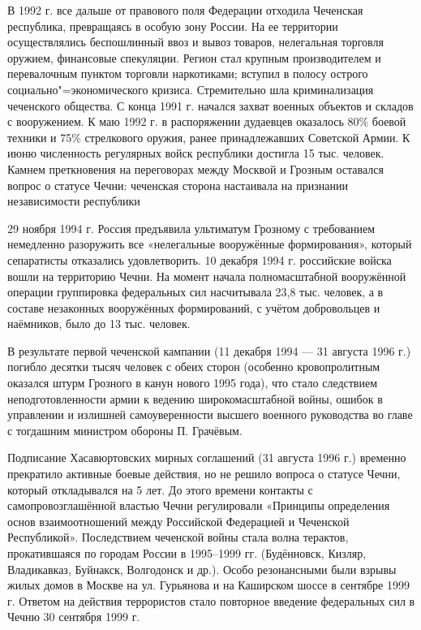 В 1992 г. все дальше от правового поля Федерации отходила Чеченская республика, превращаясь в особую зону России. На ее территории осуществлялись беспошлинный ввоз и вывоз товаров, нелегальная торговля оружием, финансовые спекуляции. Регион стал крупным производителем и перевалочным пунктом торговли наркотиками; вступил в полосу острого социально"=экономического кризиса. Стремительно шла криминализация чеченского общества. С конца 1991 г. начался захват военных объектов и складов с вооружением. К маю 1992 г. в распоряжении дудаевцев оказалось 80\% боевой техники и 75\% стрелкового оружия, ранее принадлежавших Советской Армии. К июню численность регулярных войск республики достигла 15 тыс. человек. Камнем преткновения на переговорах между Москвой и Грозным оставался вопрос о статусе Чечни: чеченская сторона настаивала на признании независимости республики

29 ноября 1994 г. Россия предъявила ультиматум Грозному с требованием немедленно разоружить все «нелегальные вооружённые формирования», который сепаратисты отказались удовлетворить. 10 декабря 1994 г. российские войска вошли на территорию Чечни. На момент начала полномасштабной вооружённой операции группировка федеральных сил насчитывала 23,8 тыс. человек, а в составе незаконных вооружённых формирований, с учётом добровольцев и наёмников, было до 13 тыс. человек.

В результате первой чеченской кампании (11 декабря 1994 — 31 августа 1996 г.) погибло десятки тысяч человек с обеих сторон (особенно кровопролитным оказался штурм Грозного в канун нового 1995 года), что стало следствием неподготовленности армии к ведению широкомасштабной войны, ошибок в управлении и излишней самоуверенности высшего военного руководства во главе с тогдашним министром обороны П. Грачёвым. 

Подписание Хасавюртовских мирных соглашений (31 августа 1996 г.) временно прекратило активные боевые действия, но не решило вопроса о статусе Чечни, который откладывался на 5 лет. До этого времени контакты с самопровозглашённой властью Чечни регулировали «Принципы определения основ взаимоотношений между Российской Федерацией и Чеченской Республикой». Последствием чеченской войны стала волна терактов, прокатившаяся по городам России в 1995–1999 гг. (Будённовск, Кизляр, Владикавказ, Буйнакск, Волгодонск и др.). Особо резонансными были взрывы жилых домов в Москве на ул. Гурьянова и на Каширском шоссе в сентябре 1999 г. Ответом на действия террористов стало повторное введение федеральных сил в Чечню 30 сентября 1999 г.

